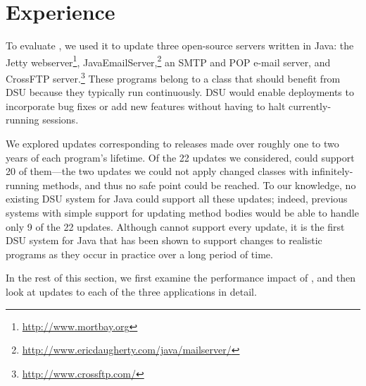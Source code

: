 \section{Experience}
\label{sec:experience}

To evaluate \DSU, we used it to update three open-source servers written
in Java: the Jetty webserver\footnote{\url{http://www.mortbay.org}},
JavaEmailServer,\footnote{\url{http://www.ericdaugherty.com/java/mailserver/}}
an SMTP and POP e-mail server, and CrossFTP server.\footnote{\url{http://www.crossftp.com/}}
These programs belong to a class that
should benefit from DSU because they typically run continuously. DSU
would enable deployments to incorporate bug fixes or add new features
without having to halt currently-running sessions.  

We explored
updates corresponding to releases made over roughly one to two years
of each program's lifetime.  Of the 22 updates we considered, \DSU{} could
support 20 of them---the two updates we could not apply changed
classes with infinitely-running methods, and thus no safe point could
be reached.  To our knowledge, no existing DSU system
for Java could support all these updates; indeed, previous systems
with simple support for updating method bodies would be able to handle only 9 of the 22 updates.  Although \DSU{} cannot support every
update, it is the first DSU system for Java
that has been shown to support changes to realistic programs as they
occur in practice over a long period of time.

In the rest of this section, we first examine the performance impact of
\DSU{}, and then look at updates to each of the three applications in
detail.





